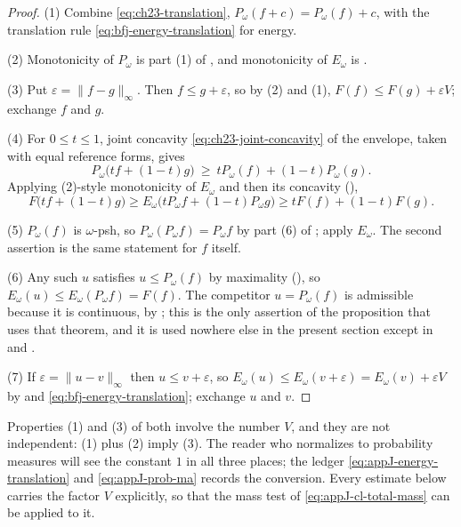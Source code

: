 \begin{proof}
(1) Combine \eqref{eq:ch23-translation}, \(P_\omega(f+c)=P_\omega(f)+c\),
with the translation rule \eqref{eq:bfj-energy-translation} for energy.

(2) Monotonicity of \(P_\omega\) is part (1) of
, and monotonicity of \(E_\omega\)
is .

(3) Put \(\varepsilon=\lVert f-g\rVert_\infty\).  Then \(f\leq g+\varepsilon\),
so by (2) and (1), \(F(f)\leq F(g)+\varepsilon V\); exchange \(f\) and
\(g\).

(4) For \(0\leq t\leq1\), joint concavity \eqref{eq:ch23-joint-concavity} of
the envelope, taken with equal reference forms, gives
\[
 P_\omega\bigl(tf+(1-t)g\bigr)\ \geq\ tP_\omega(f)+(1-t)P_\omega(g).
\]
Applying (2)-style monotonicity of \(E_\omega\) and then its concavity
(),
\[
 F\bigl(tf+(1-t)g\bigr)
 \geq E_\omega\bigl(tP_\omega f+(1-t)P_\omega g\bigr)
 \geq tF(f)+(1-t)F(g).
\]

(5) \(P_\omega(f)\) is \(\omega\)-psh, so
\(P_\omega(P_\omega f)=P_\omega f\) by part (6) of
; apply \(E_\omega\).  The second
assertion is the same statement for \(f\) itself.

(6) Any such \(u\) satisfies \(u\leq P_\omega(f)\) by maximality
(), so
\(E_\omega(u)\leq E_\omega(P_\omega f)=F(f)\).  The competitor
\(u=P_\omega(f)\) is admissible because it is continuous, by
; this is the only assertion of the
proposition that uses that theorem, and it is used nowhere else in the
present section except in
 and
.

(7) If \(\varepsilon=\lVert u-v\rVert_\infty\) then \(u\leq v+\varepsilon\),
so \(E_\omega(u)\leq E_\omega(v+\varepsilon)=E_\omega(v)+\varepsilon V\) by
 and
\eqref{eq:bfj-energy-translation}; exchange \(u\) and \(v\).
\end{proof}

\begin{remark}
\label{rem:ch27-three-constants}
Properties (1) and (3) of  both involve the
number \(V\), and they are not independent: (1) plus (2) imply (3).  The
reader who normalizes to probability measures will see the constant \(1\) in
all three places; the ledger \eqref{eq:appJ-energy-translation} and
\eqref{eq:appJ-prob-ma} records the conversion.  Every estimate below
carries the factor \(V\) explicitly, so that the mass test of
\eqref{eq:appJ-cl-total-mass} can be applied to it.
\end{remark}

